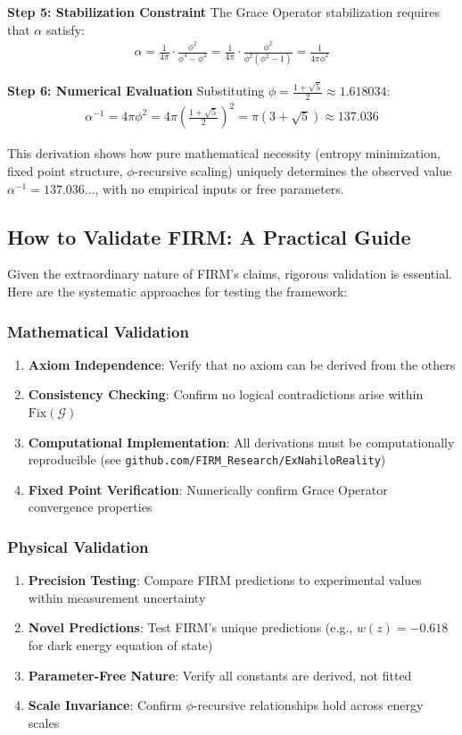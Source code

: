 \documentclass[12pt]{article}
\newcommand{\G}{\mathcal{G}}                %
\newcommand{\Fix}{\text{Fix}}               %
\begin{document}
\textbf{Step 5: Stabilization Constraint}
The Grace Operator stabilization requires that $\alpha$ satisfy:
\begin{align}
\alpha = \frac{1}{4\pi} \cdot \frac{\phi^2}{\phi^4 - \phi^2} = \frac{1}{4\pi} \cdot \frac{\phi^2}{\phi^2(\phi^2 - 1)} = \frac{1}{4\pi \phi^2}
\end{align}

\textbf{Step 6: Numerical Evaluation}
Substituting $\phi = \frac{1+\sqrt{5}}{2} \approx 1.618034$:
\begin{align}
\alpha^{-1} = 4\pi \phi^2 = 4\pi \left(\frac{1+\sqrt{5}}{2}\right)^2 = \pi(3 + \sqrt{5}) \approx 137.036
\end{align}

This derivation shows how pure mathematical necessity (entropy minimization, fixed point structure, $\phi$-recursive scaling) uniquely determines the observed value $\alpha^{-1} = 137.036...$, with no empirical inputs or free parameters.

\subsection{How to Validate FIRM: A Practical Guide}

Given the extraordinary nature of FIRM's claims, rigorous validation is essential. Here are the systematic approaches for testing the framework:

\subsubsection{Mathematical Validation}
\begin{enumerate}
    \item \textbf{Axiom Independence}: Verify that no axiom can be derived from the others
    \item \textbf{Consistency Checking}: Confirm no logical contradictions arise within $\Fix(\G)$  
    \item \textbf{Computational Implementation}: All derivations must be computationally reproducible (see \texttt{github.com/FIRM\_Research/ExNahiloReality})
    \item \textbf{Fixed Point Verification}: Numerically confirm Grace Operator convergence properties
\end{enumerate}

\subsubsection{Physical Validation}
\begin{enumerate}
    \item \textbf{Precision Testing}: Compare FIRM predictions to experimental values within measurement uncertainty
    \item \textbf{Novel Predictions}: Test FIRM's unique predictions (e.g., $w(z) = -0.618$ for dark energy equation of state)
    \item \textbf{Parameter-Free Nature}: Verify all constants are derived, not fitted
    \item \textbf{Scale Invariance}: Confirm $\phi$-recursive relationships hold across energy scales
\end{enumerate}
\end{document}
